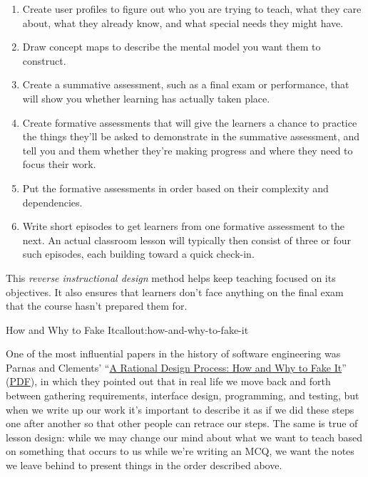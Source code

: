 \begin{enumerate}

\item
  Create user profiles to figure out who you are trying to teach, what
  they care about, what they already know, and what special needs they
  might have.

\item
  Draw concept maps to describe the mental model you want them to
  construct.

\item
  Create a summative assessment, such as a final exam or performance,
  that will show you whether learning has actually taken place.

\item
  Create formative assessments that will give the learners a chance to
  practice the things they'll be asked to demonstrate in the summative
  assessment, and tell you and them whether they're making progress
  and where they need to focus their work.

\item
  Put the formative assessments in order based on their complexity and
  dependencies.

\item
  Write short episodes to get learners from one formative assessment
  to the next.  An actual classroom lesson will typically then consist
  of three or four such episodes, each building toward a quick
  check-in.

\end{enumerate}

This \emph{reverse instructional design} method helps keep teaching
focused on its objectives. It also ensures that learners don't face
anything on the final exam that the course hasn't prepared them for.

\begin{callout}{How and Why to Fake It}{callout:how-and-why-to-fake-it}

One of the most influential papers in the history of software
engineering was Parnas and Clements'
``\href{http://dx.doi.org/10.1109/TSE.1986.6312940}{A Rational Design
Process: How and Why to Fake It}''
(\href{http://www.ics.uci.edu/~taylor/classes/121/IEEE86\_Parnas\_Clement.pdf}{PDF}),
in which they pointed out that in real life we move back and forth
between gathering requirements, interface design, programming, and
testing, but when we write up our work it's important to describe it as
if we did these steps one after another so that other people can retrace
our steps. The same is true of lesson design: while we may change our
mind about what we want to teach based on something that occurs to us
while we're writing an MCQ, we want the notes we leave behind to present
things in the order described above.
\end{callout}

